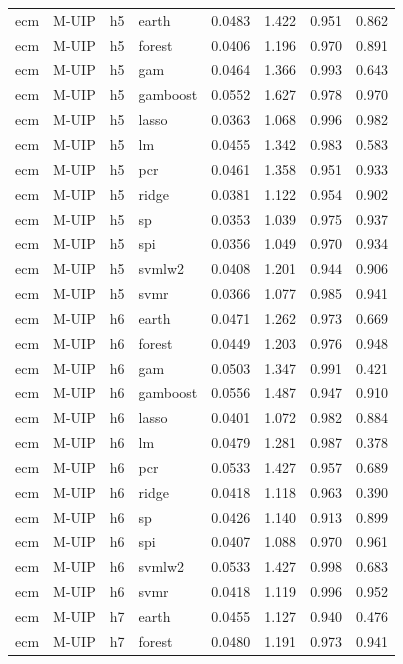 \begin{ThreePartTable}
\begin{longtable}[t]{llclcccc}
\addlinespace
ecm & M-UIP & h5 & earth & 0.0483 & 1.422 & 0.951 & 0.862\\
ecm & M-UIP & h5 & forest & 0.0406 & 1.196 & 0.970 & 0.891\\
ecm & M-UIP & h5 & gam & 0.0464 & 1.366 & 0.993 & 0.643\\
ecm & M-UIP & h5 & gamboost & 0.0552 & 1.627 & 0.978 & 0.970\\
ecm & M-UIP & h5 & lasso & 0.0363 & 1.068 & 0.996 & 0.982\\
ecm & M-UIP & h5 & lm & 0.0455 & 1.342 & 0.983 & 0.583\\
ecm & M-UIP & h5 & pcr & 0.0461 & 1.358 & 0.951 & 0.933\\
ecm & M-UIP & h5 & ridge & 0.0381 & 1.122 & 0.954 & 0.902\\
ecm & M-UIP & h5 & sp & 0.0353 & 1.039 & 0.975 & 0.937\\
ecm & M-UIP & h5 & spi & 0.0356 & 1.049 & 0.970 & 0.934\\
ecm & M-UIP & h5 & svmlw2 & 0.0408 & 1.201 & 0.944 & 0.906\\
ecm & M-UIP & h5 & svmr & 0.0366 & 1.077 & 0.985 & 0.941\\
\addlinespace
ecm & M-UIP & h6 & earth & 0.0471 & 1.262 & 0.973 & 0.669\\
ecm & M-UIP & h6 & forest & 0.0449 & 1.203 & 0.976 & 0.948\\
ecm & M-UIP & h6 & gam & 0.0503 & 1.347 & 0.991 & 0.421\\
ecm & M-UIP & h6 & gamboost & 0.0556 & 1.487 & 0.947 & 0.910\\
ecm & M-UIP & h6 & lasso & 0.0401 & 1.072 & 0.982 & 0.884\\
ecm & M-UIP & h6 & lm & 0.0479 & 1.281 & 0.987 & 0.378\\
ecm & M-UIP & h6 & pcr & 0.0533 & 1.427 & 0.957 & 0.689\\
ecm & M-UIP & h6 & ridge & 0.0418 & 1.118 & 0.963 & 0.390\\
ecm & M-UIP & h6 & sp & 0.0426 & 1.140 & 0.913 & 0.899\\
ecm & M-UIP & h6 & spi & 0.0407 & 1.088 & 0.970 & 0.961\\
ecm & M-UIP & h6 & svmlw2 & 0.0533 & 1.427 & 0.998 & 0.683\\
ecm & M-UIP & h6 & svmr & 0.0418 & 1.119 & 0.996 & 0.952\\
\addlinespace
ecm & M-UIP & h7 & earth & 0.0455 & 1.127 & 0.940 & 0.476\\
ecm & M-UIP & h7 & forest & 0.0480 & 1.191 & 0.973 & 0.941\\

\end{longtable}
\end{ThreePartTable}
